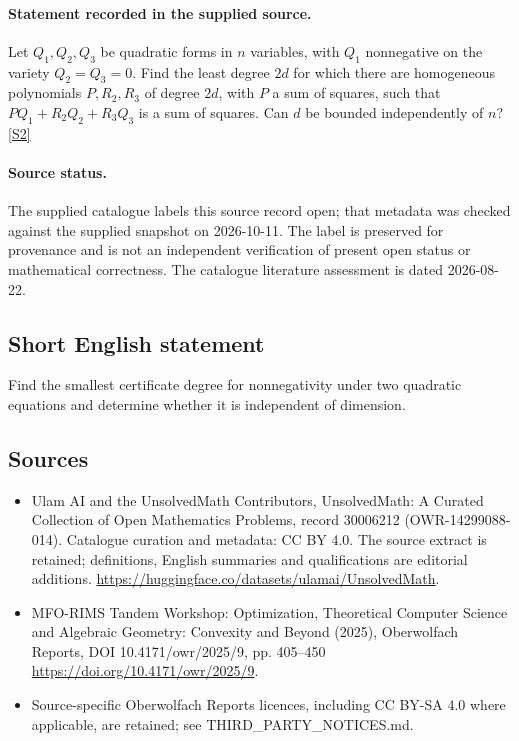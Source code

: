 \documentclass[11pt]{article}
\begin{document}
\paragraph{Statement recorded in the supplied source.}
Let $Q_1,Q_2,Q_3$ be quadratic forms in $n$ variables, with $Q_1$ nonnegative on the variety $Q_2=Q_3=0$. Find the least degree $2d$ for which there are homogeneous polynomials $P,R_2,R_3$ of degree $2d$, with $P$ a sum of squares, such that $PQ_1+R_2Q_2+R_3Q_3$ is a sum of squares. Can $d$ be bounded independently of $n$? \href{https://doi.org/10.4171/owr/2025/9}{[S2]}
\paragraph{Source status.}
The supplied catalogue labels this source record open; that metadata was checked against the supplied snapshot on 2026-10-11. The label is preserved for provenance and is not an independent verification of present open status or mathematical correctness. The catalogue literature assessment is dated 2026-08-22.
\subsection{Short English statement}
Find the smallest certificate degree for nonnegativity under two quadratic equations and determine whether it is independent of dimension.
\subsection{Sources}
\begin{itemize}
\item[S1] Ulam AI and the UnsolvedMath Contributors, UnsolvedMath: A Curated Collection of Open Mathematics Problems, record 30006212 (OWR-14299088-014). Catalogue curation and metadata: CC BY 4.0. The source extract is retained; definitions, English summaries and qualifications are editorial additions.
\url{https://huggingface.co/datasets/ulamai/UnsolvedMath}.
\item[S2] MFO-RIMS Tandem Workshop: Optimization, Theoretical Computer Science and Algebraic Geometry: Convexity and Beyond (2025), Oberwolfach Reports, DOI 10.4171/owr/2025/9, pp. 405--450
\url{https://doi.org/10.4171/owr/2025/9}.
\item Source-specific Oberwolfach Reports licences, including CC BY-SA 4.0 where applicable, are retained; see THIRD\_PARTY\_NOTICES.md.
\end{itemize}
\end{document}
